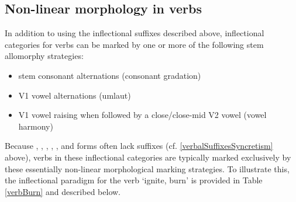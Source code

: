 \subsection{Non-linear morphology in verbs}\label{nonLinearMorphVerbs}
In addition to using the inflectional suffixes described above, inflectional categories for verbs can be marked %
by one or more of the following stem allomorphy strategies: %
\begin{itemize}
\item{stem consonant alternations (consonant gradation)}
\item{V1 vowel alternations (umlaut)}
\item{V1 vowel raising when followed by a close/close-mid V2 vowel (vowel harmony)}
\end{itemize}
Because , , , , ,  and  forms often lack suffixes (cf. \SEC\ref{verbalSuffixesSyncretism} above), verbs in these inflectional categories are typically marked exclusively by these essentially non-linear morphological marking strategies. 
To illustrate this, the inflectional paradigm for the verb  ‘ignite, burn’ is provided in Table \vref{verbBurn} and described below. 
\renewcommand{\Xp}[1]{\MC{1}{x{90pt}}{#1}}%
